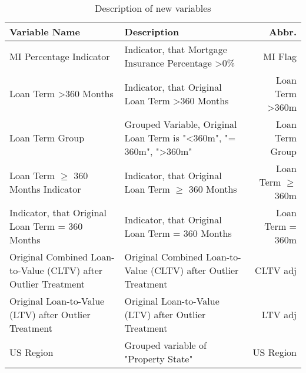 \begin{table}[h!]
\centering
\begin{tabular}{ Lp{8cm}R } \toprule
\textbf{Variable Name}  & \textbf{Description}                                                                                                                                                                                                                                                          & \textbf{Abbr.}       \\\midrule
MI Percentage Indicator                                        & Indicator, that Mortgage Insurance Percentage \textgreater 0\%                           & MI Flag                     \\\hline
Loan Term \textgreater 360 Months                              & Indicator, that Original Loan Term \textgreater 360 Months                               & Loan Term \textgreater 360m \\\hline
Loan Term Group                                                & Grouped Variable, Original Loan Term is "\textless 360m", "= 360m", "\textgreater{}360m" & Loan Term Group             \\\hline
Loan Term $\geq$ 360 Months Indicator                          & Indicator, that Original Loan Term $\geq$ 360 Months                                     & Loan Term $\geq$ 360m        \\\hline
Indicator, that Original Loan Term = 360 Months                & Indicator, that Original Loan Term = 360 Months                                          & Loan Term = 360m            \\\hline
Original Combined Loan-to-Value (CLTV) after Outlier Treatment & Original Combined Loan-to-Value (CLTV) after Outlier Treatment                           & CLTV adj                    \\\hline
Original Loan-to-Value (LTV) after Outlier Treatment           & Original Loan-to-Value (LTV) after Outlier Treatment                                     & LTV adj                     \\\hline
US Region                                                      & Grouped variable of "Property State"                                                     & US Region                \\\bottomrule
\end{tabular}%
\caption{Description of new variables}
\label{tab:re_descr_newvar}
\end{table}

